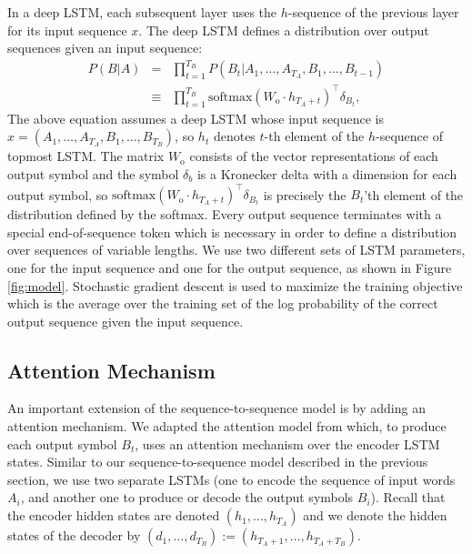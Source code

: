 \documentclass{article} \usepackage{nips15submit_e,times}
\begin{document}
In a deep LSTM, each subsequent layer uses the $h$-sequence of the previous
layer for its input sequence $x$. The deep LSTM defines a distribution over
output sequences given an input sequence:
\begin{eqnarray*}
P(B|A) &=& \prod_{t=1}^{T_B} P(B_t|A_1,\ldots,A_{T_A},B_1,\ldots,B_{t-1}) \\
       &\equiv& \prod_{t=1}^{T_B}\mathrm{softmax}(W_\mathrm{o} \cdot h_{T_A+t})^\top \delta_{B_t},
\end{eqnarray*}
The above equation assumes a deep LSTM whose input sequence is
$x = (A_1,\ldots,A_{T_A},B_1,\ldots,B_{T_B})$, so $h_t$ denotes $t$-th element
of the $h$-sequence of topmost LSTM.
The matrix $W_{\mathrm{o}}$ consists of the vector representations of
each output symbol and the symbol $\delta_b$ is a Kronecker
delta with a dimension for each output symbol,
so $\mathrm{softmax}(W_\mathrm{o} \cdot h_{T_A + t})^\top \delta_{B_t}$ is precisely
the $B_t$'th element of the distribution defined by the softmax.
Every output sequence terminates with a special end-of-sequence token which is
necessary in order to define a distribution over sequences of variable lengths.
We use two different sets of LSTM parameters, one for the input sequence and
one for the output sequence, as shown in Figure \ref{fig:model}.
Stochastic gradient descent is used to maximize the training objective
which is the average over the training set of the log probability
of the correct output sequence given the input sequence.

\subsection{Attention Mechanism}
\label{sec:attention}
An important extension of the sequence-to-sequence model is by adding an
attention mechanism. We adapted the attention model from \cite{bahdanau2014neural}
which, to produce each output symbol $B_t$, uses an attention mechanism over
the encoder LSTM states. Similar to our sequence-to-sequence model described
in the previous section, we use two separate LSTMs (one to encode the sequence
of input words $A_i$, and another one to produce or decode the output
symbols $B_i$). Recall that the encoder hidden states are denoted
$(h_1,\ldots,h_{T_A})$ and we denote the hidden states of the decoder by
$(d_1,\ldots,d_{T_B}) := (h_{T_A+1},\ldots,h_{T_A+T_B})$.
\end{document}

